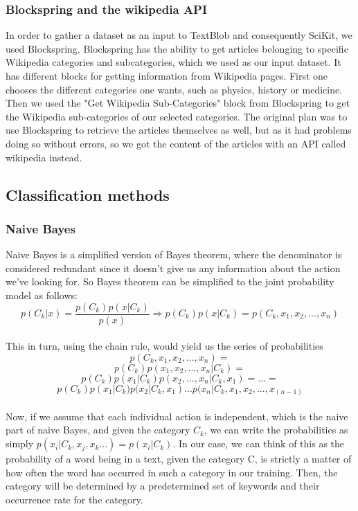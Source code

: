 \documentclass[a4paper,10pt]{article}
\begin{document}
\subsubsection{Blockspring and the wikipedia API}

In order to gather a dataset as an input to TextBlob and consequently SciKit, we used Blockspring. Blockspring has the ability to get articles belonging to specific Wikipedia categories and subcategories, which we used as our input dataset. It has different blocks for getting information from Wikipedia pages. First one chooses the different categories one wants, such as physics, history or medicine. Then we used the "Get Wikipedia Sub-Categories" block from Blockspring to get the Wikipedia sub-categories of our selected categories. The original plan was to use Blockspring to retrieve the articles themselves as well, but as it had problems doing so without errors, so we got the content of the articles with an API called wikipedia instead. 




\subsection{Classification methods}
\subsubsection{Naive Bayes} 

Naive Bayes is a simplified version of Bayes theorem, where the denominator is considered redundant since it doesn't give us any information about the action we've looking for. So Bayes theorem can be simplified to the joint probability model as follows:
\\\[p(C_k|x) = \frac{p(C_k)p(x|C_k)}{p(x)} \Longrightarrow p(C_k)p(x|C_k) = p(C_k,x_1,x_2,...,x_n)\]\\
This in turn, using the chain rule, would yield us the series of probabilities \[p(C_k,x_1,x_2,...,x_n) = \]
\[p(C_k)p(x_1,x_2,...,x_n|C_k) =\]
\[p(C_k)p(x_1|C_k)p(x_2,...,x_n|C_k, x_1) = ... =\]
\[p(C_k)p(x_1|C_k)p(x_2|C_k, x_1) ... p(x_n|C_k, x_1, x_2,...,x_(n-1) \]\\
Now, if we assume that each individual action is independent, which is the naive part of naive Bayes, and given the category $C_k$, we can write the probabilities as simply $p(x_i|C_k, x_j,x_k...) = p(x_i|C_k)$. In our case, we can think of this as the probability of a word being in a text, given the category C, is strictly a matter of how often the word has occurred in such a category in our training. Then, the category will be determined by a predetermined set of keywords and their occurrence rate for the category.\\
\end{document}
